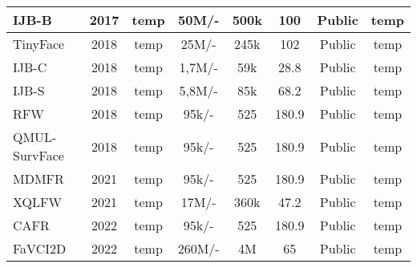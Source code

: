 \documentclass[class=report, crop=false, a4paper, 12pt]{standalone}
\begin{document}
\begin{table}[!ht]
{\begin{tabular}{|l|c|c|c|c|c|c|c|}
    IJB-B \autocite{whitelamIARPAJanusBenchmarkB2017}                                 & 2017          & temp                  & 50M/-                  & 500k           & 100                   & Public                & temp                 \\ \hline
    TinyFace \autocite{chengLowResolutionFaceRecognition2019}                               & 2018          & temp                  & 25M/-                  & 245k           & 102                   & Public                & temp                 \\ \hline
    IJB-C \autocite{mazeIARPAJanusBenchmark2018}                                  & 2018          & temp                  & 1,7M/-                 & 59k            & 28.8                  & Public                & temp                 \\ \hline
    IJB-S \autocite{kalkaIJBIARPAJanus2018}                                  & 2018          & temp                  & 5,8M/-                 & 85k            & 68.2                  & Public                & temp                 \\ \hline
    RFW \autocite{wangRacialFacesWild2019}                                    & 2018 & temp                  & 95k/-                  & 525            & 180.9                 & Public                & temp                 \\ \hline          
    QMUL-SurvFace \autocite{chengSurveillanceFaceRecognition2018}                          & 2018          & temp                  & 95k/-                  & 525            & 180.9                 & Public                & temp                 \\ \hline
    MDMFR \autocite{ullahNovelDeepMaskNetModel2022}                                  & 2021          & temp                  & 95k/-                  & 525            & 180.9                 & Public                & temp                 \\ \hline
    XQLFW \autocite{knocheCrossQualityLFWDatabase2021}                                  & 2021          & temp                  & 17M/-                  & 360k           & 47.2                  & Public                & temp                 \\ \hline
    CAFR \autocite{zhaoAgeInvariantFaceRecognition2022}                                   & 2022          & temp                  & 95k/-                  & 525            & 180.9                 & Public                & temp                 \\ \hline
    FaVCI2D \autocite{popescuFaceVerificationChallenging2022}                                & 2022          & temp                  & 260M/-                 & 4M             & 65                    & Public                & temp                 \\ \hline
    \end{tabular}%
    }
    \caption{}
    \label{tab:test data}
\end{table}
\end{document}
